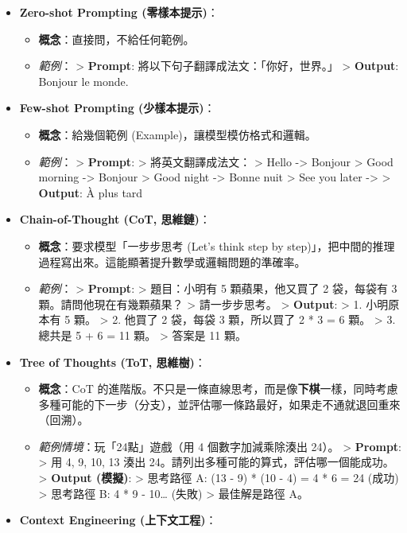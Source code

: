 \documentclass[
  letterpaper,
  DIV=11,
  numbers=noendperiod]{scrreprt}
\providecommand{\tightlist}{%
  \setlength{\itemsep}{0pt}\setlength{\parskip}{0pt}}
\begin{document}
\begin{itemize}
\tightlist
\item
  \textbf{Zero-shot Prompting (零樣本提示)}：

  \begin{itemize}
  \tightlist
  \item
    \textbf{概念}：直接問，不給任何範例。
  \item
    \emph{範例}： \textgreater{} \textbf{Prompt}:
    將以下句子翻譯成法文：「你好，世界。」 \textgreater{}
    \textbf{Output}: Bonjour le monde.
  \end{itemize}
\item
  \textbf{Few-shot Prompting (少樣本提示)}：

  \begin{itemize}
  \tightlist
  \item
    \textbf{概念}：給幾個範例 (Example)，讓模型模仿格式和邏輯。
  \item
    \emph{範例}： \textgreater{} \textbf{Prompt}: \textgreater{}
    將英文翻譯成法文： \textgreater{} Hello -\textgreater{} Bonjour
    \textgreater{} Good morning -\textgreater{} Bonjour \textgreater{}
    Good night -\textgreater{} Bonne nuit \textgreater{} See you later
    -\textgreater{} \textgreater{} \textbf{Output}: À plus tard
  \end{itemize}
\item
  \textbf{Chain-of-Thought (CoT, 思維鏈)}：

  \begin{itemize}
  \tightlist
  \item
    \textbf{概念}：要求模型「一步步思考 (Let's think step by
    step)」，把中間的推理過程寫出來。這能顯著提升數學或邏輯問題的準確率。
  \item
    \emph{範例}： \textgreater{} \textbf{Prompt}: \textgreater{}
    題目：小明有 5 顆蘋果，他又買了 2 袋，每袋有 3
    顆。請問他現在有幾顆蘋果？ \textgreater{} 請一步步思考。
    \textgreater{} \textbf{Output}: \textgreater{} 1. 小明原本有 5 顆。
    \textgreater{} 2. 他買了 2 袋，每袋 3 顆，所以買了 2 * 3 = 6 顆。
    \textgreater{} 3. 總共是 5 + 6 = 11 顆。 \textgreater{} 答案是 11
    顆。
  \end{itemize}
\item
  \textbf{Tree of Thoughts (ToT, 思維樹)}：

  \begin{itemize}
  \tightlist
  \item
    \textbf{概念}：CoT
    的進階版。不只是一條直線思考，而是像\textbf{下棋}一樣，同時考慮多種可能的下一步（分支），並評估哪一條路最好，如果走不通就退回重來（回溯）。
  \item
    \emph{範例情境}：玩「24點」遊戲（用 4 個數字加減乘除湊出 24）。
    \textgreater{} \textbf{Prompt}: \textgreater{} 用 4, 9, 10, 13 湊出
    24。請列出多種可能的算式，評估哪一個能成功。 \textgreater{}
    \textbf{Output (模擬)}: \textgreater{} 思考路徑 A: (13 - 9) * (10 -
    4) = 4 * 6 = 24 (成功) \textgreater{} 思考路徑 B: 4 * 9 - 10\ldots{}
    (失敗) \textgreater{} 最佳解是路徑 A。
  \end{itemize}
\item
  \textbf{Context Engineering (上下文工程)}：


\end{itemize}
\end{document}
